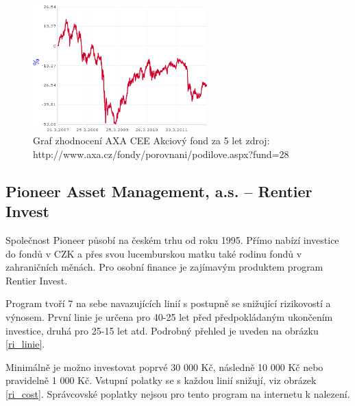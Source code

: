 \documentclass[a4paper,12pt]{article}
\begin{document}
			\begin{figure}[h!]
		  	\centering
				\includegraphics[width=0.6\textwidth]{axa_cee_akc.png}			
				\caption{Graf zhodnocení AXA CEE Akciový fond za 5 let zdroj: http://www.axa.cz/fondy/porovnani/podilove.aspx?fund=28}
				\label{axa_cee_akc}
			\end{figure}
	\subsection{Pioneer Asset Management, a.s. -- Rentier Invest}
		Společnost Pioneer působí na českém trhu od roku 1995. Přímo nabízí investice do fondů v CZK a přes svou lucemburskou matku také rodinu fondů v zahraničních měnách.\cite{pio_about} Pro osobní finance je zajímavým produktem program Rentier Invest.
		
		Program tvoří 7 na sebe navazujících linií s postupně se snižující rizikovostí a výnosem. První linie je určena pro 40-25 let před předpokládaným ukončením investice, druhá pro 25-15 let atd. Podrobný přehled je uveden na obrázku \ref{ri_linie}.
		
		Minimálně je možno investovat poprvé 30 000 Kč, následně 10 000 Kč nebo pravidelně 1 000 Kč. Vstupní polatky se s každou linií snižují, viz obrázek \ref{ri_cost}. Správcovské poplatky nejsou pro tento program na internetu k nalezení.
		
\end{document}
